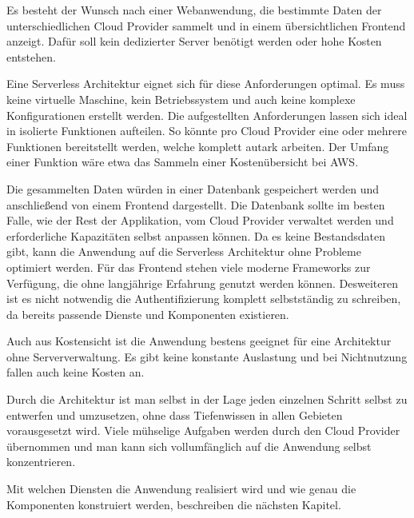 Es besteht der Wunsch nach einer Webanwendung, die bestimmte Daten der unterschiedlichen Cloud Provider sammelt und in einem übersichtlichen Frontend anzeigt.
Dafür soll kein dedizierter Server benötigt werden oder hohe Kosten entstehen.

Eine Serverless Architektur eignet sich für diese Anforderungen optimal.
Es muss keine virtuelle Maschine, kein Betriebssystem und auch keine komplexe Konfigurationen erstellt werden.
Die aufgestellten Anforderungen lassen sich ideal in isolierte Funktionen aufteilen.
So könnte pro Cloud Provider eine oder mehrere Funktionen bereitstellt werden, welche komplett autark arbeiten.
Der Umfang einer Funktion wäre etwa das Sammeln einer Kostenübersicht bei AWS.

Die gesammelten Daten würden in einer Datenbank gespeichert werden und anschließend von einem Frontend dargestellt.
Die Datenbank sollte im besten Falle, wie der Rest der Applikation, vom Cloud Provider verwaltet werden und erforderliche Kapazitäten selbst anpassen können.
Da es keine Bestandsdaten gibt, kann die Anwendung auf die Serverless Architektur ohne Probleme optimiert werden.
Für das Frontend stehen viele moderne Frameworks zur Verfügung, die ohne langjährige Erfahrung genutzt werden können.
Desweiteren ist es nicht notwendig die Authentifizierung komplett selbstständig zu schreiben, da bereits passende Dienste und Komponenten existieren.

Auch aus Kostensicht ist die Anwendung bestens geeignet für eine Architektur ohne Serververwaltung.
Es gibt keine konstante Auslastung und bei Nichtnutzung fallen auch keine Kosten an.


Durch die Architektur ist man selbst in der Lage jeden einzelnen Schritt selbst zu entwerfen und umzusetzen, ohne dass Tiefenwissen in allen Gebieten vorausgesetzt wird.
Viele mühselige Aufgaben werden durch den Cloud Provider übernommen und man kann sich vollumfänglich auf die Anwendung selbst konzentrieren.

Mit welchen Diensten die Anwendung realisiert wird und wie genau die Komponenten konstruiert werden, beschreiben die nächsten Kapitel.



